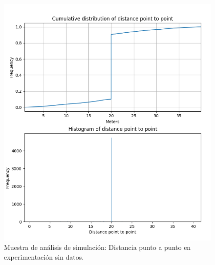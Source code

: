 \begin{figure}[!htb]
\begin{minipage}{0.48\textwidth}
\includegraphics[width=1.2\textwidth]{./Imagenes/SimulateCumulativePointPointEmpty.png}
\caption{Muestra de análisis de simulación: Distancia punto a punto en experimentación sin datos.}
\label{figure:SimulatedPointToPointEmpty}
\end{minipage}
\end{figure}


